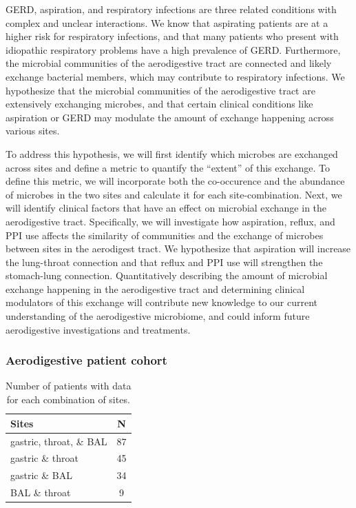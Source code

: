 \documentclass[12pt]{article}
\begin{document}
GERD, aspiration, and respiratory infections are three related
conditions with complex and unclear interactions.
We know that aspirating patients are at a higher risk for respiratory
infections, and that many patients who present with idiopathic
respiratory problems have a high prevalence of GERD. 
Furthermore, the microbial communities of the aerodigestive tract
are connected and likely exchange bacterial members, which may
contribute to respiratory infections. We hypothesize that the
microbial communities of the aerodigestive tract are extensively
exchanging microbes, and that certain clinical conditions like aspiration
or GERD may modulate the amount of exchange happening across various sites.

To address this hypothesis, we will first identify which microbes
are exchanged across sites and define a metric to quantify the ``extent'' of this exchange. 
To define this metric, we will incorporate both the co-occurence and the abundance
of microbes in the two sites and calculate it for each site-combination.
Next, we will identify clinical factors that have an effect on microbial
exchange in the aerodigestive tract. Specifically, we will investigate how aspiration,
reflux, and PPI use affects the similarity of communities and the
exchange of microbes between sites in the aerodigest tract.
We hypothesize that aspiration will increase the lung-throat connection and 
that reflux and PPI use will strengthen the stomach-lung connection.
Quantitatively describing the amount of microbial exchange happening in the
aerodigestive tract and determining clinical modulators of this exchange
will contribute new knowledge to our current understanding of the
aerodigestive microbiome, and could inform future aerodigestive
investigations and treatments.

\subsubsection{Aerodigestive patient cohort}

\begin{table}
\begin{tabular}{l c}
	\hline
	\textbf{Sites} & \textbf{N} \\
	\hline
	gastric, throat, \& BAL & 87 \\
	gastric \& throat & 45 \\
	gastric \& BAL & 34 \\
	BAL \& throat & 9 \\
	\hline 
\end{tabular}
\caption{Number of patients with data for each combination of sites.}\label{tab:rosen_samples}
\end{table}
\end{document}
